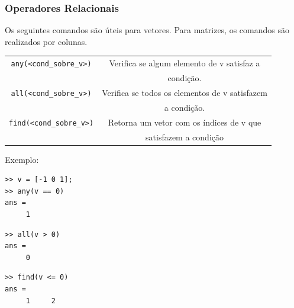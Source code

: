 \documentclass{beamer}
\begin{document}
\begin{frame}[fragile]
\frametitle{Operadores Relacionais}
Os seguintes comandos s\~ao \'uteis para vetores. Para matrizes, os comandos s\~ao realizados por colunas.
{\scriptsize
\begin{center}
\begin{tabular}{|c|c|}
\hline
{\tt any(<cond\_sobre\_v>)} & Verifica se algum elemento de v satisfaz a \\
& condi\c{c}\~ao. \\ \hline
{\tt all(<cond\_sobre\_v>)} & Verifica se todos os elementos de v satisfazem \\
& a condi\c{c}\~ao. \\ \hline
{\tt find(<cond\_sobre\_v>)} & Retorna um vetor com os \'indices de v que \\
& satisfazem a condi\c{c}\~ao \\ \hline
\end{tabular}
\end{center}}
\pause

Exemplo:
{\scriptsize
\begin{center}
\begin{minipage}{3 cm}
\begin{verbatim}
>> v = [-1 0 1];
>> any(v == 0)
ans =
     1
\end{verbatim}
\end{minipage}
\begin{minipage}{3 cm}
\begin{verbatim}
>> all(v > 0)
ans =
     0
\end{verbatim}
\end{minipage}
\begin{minipage}{3 cm}
\begin{verbatim}
>> find(v <= 0)
ans =
     1     2
\end{verbatim}
\end{minipage}
\end{center}}

\end{frame}
\end{document}
